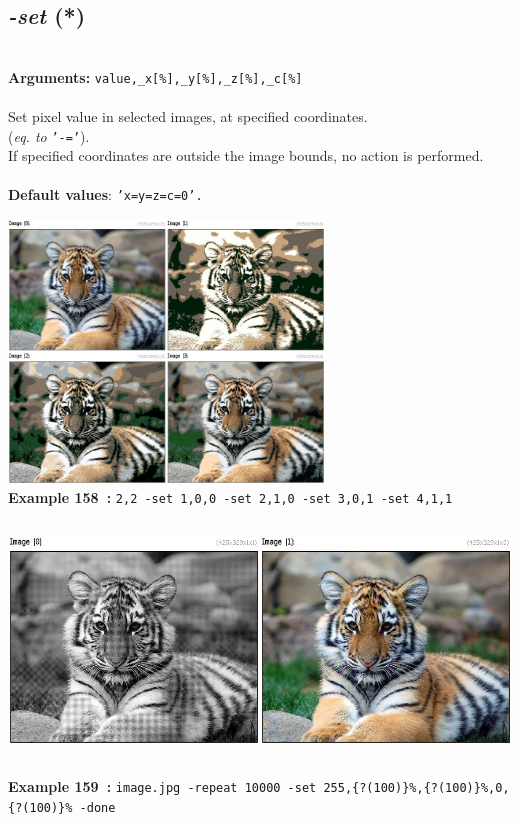 \documentclass[a4paper,11pt,twoside]{book}
\begin{document}
\subsection{\emph{-set} (*)}\vspace*{-0.5em}
~\\\textbf{Arguments: } 
{\small \texttt{value,\_x[\%],\_y[\%],\_z[\%],\_c[\%]}}\\~\\
Set pixel value in selected images, at specified coordinates.
~\\(\emph{eq. to} {\small \texttt{'-='}}).
~\\If specified coordinates are outside the image bounds, no action is performed.
~\\~\\\textbf{Default values}: {\small \texttt{'x=y=z=c=0'.}}
\begin{center}\includegraphics[keepaspectratio=true,height=7cm,width=\textwidth]{img/gmic_def158.jpg}\\
{\footnotesize \textbf{Example 158~:} \texttt{2,2 -set 1,0,0 -set 2,1,0 -set 3,0,1 -set 4,1,1}}
\\\includegraphics[keepaspectratio=true,height=7cm,width=\textwidth]{img/gmic_def159.jpg}\\
{\footnotesize \textbf{Example 159~:} \texttt{image.jpg -repeat 10000 -set 255,\{?(100)\}\%,\{?(100)\}\%,0,\{?(100)\}\% -done}}
\end{center}
\end{document}
